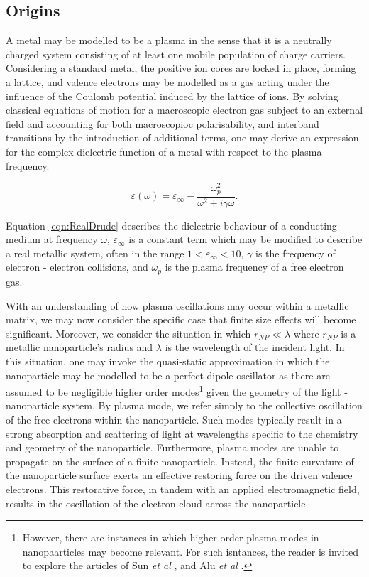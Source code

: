 \subsection{Origins}
\label{sec:origins_plasmon}
A metal may be modelled to be a plasma in the sense that it is a neutrally charged system consisting of at least one mobile population of charge carriers. Considering a standard metal, the positive ion cores are locked in place, forming a lattice, and valence electrons may be modelled as a gas acting under the influence of the Coulomb potential induced by the lattice of ions. By solving classical equations of motion for a macroscopic electron gas subject to an external field and accounting for both macroscopioc polarisability, and interband transitions by the introduction of additional terms, one may derive an expression for the complex dielectric function of a metal with respect to the plasma frequency. 

\begin{equation}
    \varepsilon(\omega) = \varepsilon_{\infty} - \frac{\omega_{p}^{2}}{ \omega^{2} + i\gamma\omega }.
    \label{eqn:RealDrude}
\end{equation}

Equation \ref{eqn:RealDrude} describes the dielectric behaviour of a conducting medium at frequency $\omega$, $\varepsilon_{\infty}$ is a constant term which may be modified to describe a real metallic system, often in the range $ 1 < \varepsilon_{\infty} < 10$, $\gamma$ is the frequency of electron - electron collisions, and $\omega_{p}$ is the plasma frequency of a free electron gas.

With an understanding of how plasma oscillations may occur within a metallic matrix, we may now consider the specific case that finite size effects will become significant. Moreover, we consider the situation in which $r_{NP} \ll \lambda$ where $r_{NP}$ is a metallic nanoparticle's radius and $\lambda$ is the wavelength of the incident light. In this situation, one may invoke the quasi-static approximation in which the nanoparticle may be modelled to be a perfect dipole oscillator as there are assumed to be negligible higher order modes\footnote{However, there are instances in which higher order plasma modes in nanopaarticles may become relevant. For such isntances, the reader is invited to explore the articles of Sun \textit{et al} \cite{10.1063/1.3250160}, and Alu \textit{et al} \cite{Alu:07}.} given the geometry of the light - nanoparticle system. By plasma mode, we refer simply to the collective oscillation of the free electrons within the nanoparticle. Such modes typically result in a strong absorption and scattering of light at wavelengths specific to the chemistry and geometry of the nanoparticle. Furthermore, plasma modes are unable to propagate on the surface of a finite nanoparticle. Instead, the finite curvature of the nanoparticle surface exerts an effective restoring force on the driven valence electrons. This restorative force, in tandem with an applied electromagnetic field, results in the oscillation of the electron cloud across the nanoparticle. 

